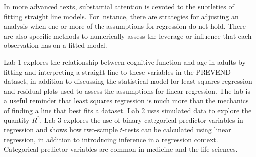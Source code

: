 In more advanced texts, substantial attention is devoted to the subtleties of fitting straight line models. For instance, there are strategies for adjusting an analysis when one or more of the assumptions for regression do not hold. There are also specific methods to numerically assess the leverage or influence that each observation has on a fitted model.

Lab 1 explores the relationship between cognitive function and age in adults by fitting and interpreting a straight line to these variables in the PREVEND dataset, in addition to discussing the statistical model for least squares regression and residual plots used to assess the assumptions for linear regression.  The lab is a useful reminder that least squares regression is much more than the mechanics of finding a line that best fits a dataset.  Lab 2 uses simulated data to explore the quantity $R^2$. Lab 3 explores the use of binary categorical predictor variables in regression and shows how two-sample $t$-tests can be calculated using linear regression, in addition to introducing inference in a regression context. Categorical predictor variables are common in medicine and the life sciences. 

